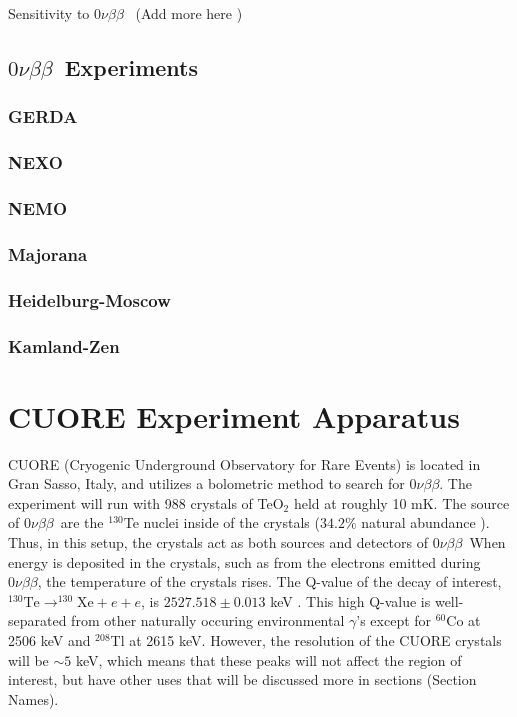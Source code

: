 \documentclass[12pt,a4paper]{article}
\newcommand{\zeronubb}{$0\nu \beta \beta$}
\begin{document}
Sensitivity to \zeronubb~ (\color{cyan}Add more here \color{black})

\subsection{\zeronubb~Experiments}
\subsubsection{GERDA}
\subsubsection{NEXO}
\subsubsection{NEMO}
\subsubsection{Majorana}
\subsubsection{Heidelburg-Moscow}
\subsubsection{Kamland-Zen}

\section{CUORE Experiment Apparatus}

CUORE (Cryogenic Underground Observatory for Rare Events) is located in Gran Sasso, Italy, and utilizes a bolometric method to search for \zeronubb. The experiment will run with 988 crystals of TeO$_2$ held at roughly 10 mK. The source of \zeronubb~are the $^{130}$Te nuclei inside of the crystals ($34.2\%$ natural abundance \cite{Te130 Abundance}). Thus, in this setup, the crystals act as both sources and detectors of \zeronubb~When energy is deposited in the crystals, such as from the electrons emitted during \zeronubb, the temperature of the crystals rises. The Q-value of the decay of interest, $^{130}\textrm{Te} \rightarrow ^{130}\textrm{Xe} + e + e$, is $2527.518\pm 0.013$ keV \cite{QValue_1} \cite{QValue_2} \cite{QValue_3}. This high Q-value is well-separated from other naturally occuring environmental $\gamma$'s except for $^{60}$Co at 2506 keV and $^{208}$Tl at 2615 keV. However, the resolution of the CUORE crystals will be $\sim5$ keV, which means that these peaks will not affect the region of interest, but have other uses that will be discussed more in sections (\color{green}Section Names\color{black}).
\end{document}
